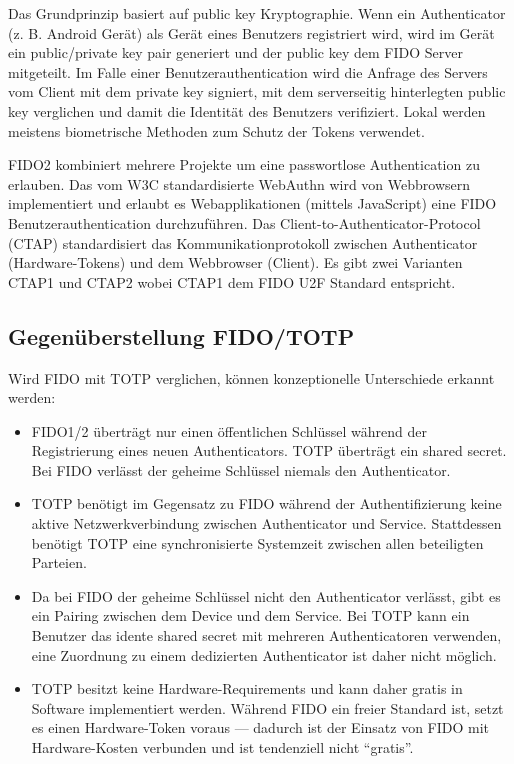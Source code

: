 Das Grundprinzip basiert auf public key Kryptographie. Wenn ein Authenticator (z. B. Android Gerät) als Gerät eines Benutzers registriert wird, wird im Gerät ein public/private key pair generiert und der public key dem FIDO Server mitgeteilt. Im Falle einer Benutzerauthentication wird die Anfrage des Servers vom Client mit dem private key signiert, mit dem serverseitig hinterlegten public key verglichen und damit die Identität des Benutzers verifiziert. Lokal werden meistens biometrische Methoden zum Schutz der Tokens verwendet.

FIDO2 kombiniert mehrere Projekte um eine passwortlose Authentication zu erlauben. Das vom W3C standardisierte WebAuthn wird von Webbrowsern implementiert und erlaubt es Webapplikationen (mittels JavaScript) eine FIDO Benutzerauthentication durchzuführen. Das Client-to-Authenticator-Protocol (CTAP) standardisiert das Kommunikationprotokoll zwischen Authenticator (Hardware-Tokens) und dem Webbrowser (Client). Es gibt zwei Varianten CTAP1 und CTAP2 wobei CTAP1 dem FIDO U2F Standard entspricht.

\subsection{Gegenüberstellung FIDO/TOTP}

Wird FIDO mit TOTP verglichen, können konzeptionelle Unterschiede erkannt werden:

\begin{itemize}
	\item FIDO1/2 überträgt nur einen öffentlichen Schlüssel während der Registrierung eines neuen Authenticators. TOTP überträgt ein shared secret. Bei FIDO verlässt der geheime Schlüssel niemals den Authenticator.
	\item TOTP benötigt im Gegensatz zu FIDO während der Authentifizierung keine aktive Netzwerkverbindung zwischen Authenticator und Service. Stattdessen benötigt TOTP eine synchronisierte Systemzeit zwischen allen beteiligten Parteien.
	\item Da bei FIDO der geheime Schlüssel nicht den Authenticator verlässt, gibt es ein Pairing zwischen dem Device und dem Service. Bei TOTP kann ein Benutzer das idente shared secret mit mehreren Authenticatoren verwenden, eine Zuordnung zu einem dedizierten Authenticator ist daher nicht möglich.
	\item TOTP besitzt keine Hardware-Requirements und kann daher gratis in Software implementiert werden. Während FIDO ein freier Standard ist, setzt es einen Hardware-Token voraus --- dadurch ist der Einsatz von FIDO mit Hardware-Kosten verbunden und ist tendenziell nicht ``gratis''.
\end{itemize}

